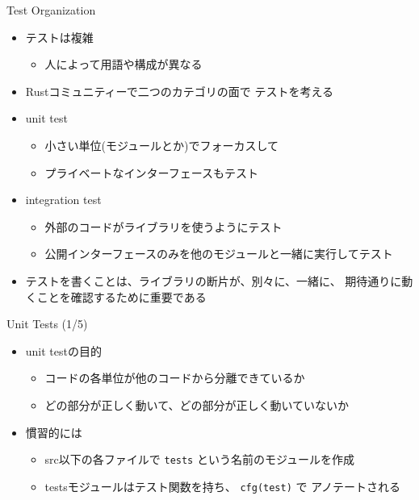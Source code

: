 \documentclass[cjk,14pt,xcolor=dvipsnames,table,dvipdfmx,professional font,t,fragile]{beamer}
\begin{document}
\begin{frame}[fragile]{Test Organization}
 \begin{itemize}
  \item テストは複雑
	\begin{itemize}
	 \item 人によって用語や構成が異なる
	\end{itemize}
  \item Rustコミュニティーで二つのカテゴリの面で
	テストを考える
  \item unit test
	\begin{itemize}
	 \item 小さい単位(モジュールとか)でフォーカスして
	 \item プライベートなインターフェースもテスト
	\end{itemize}
  \item integration test
	\begin{itemize}
	 \item 外部のコードがライブラリを使うようにテスト
	 \item 公開インターフェースのみを他のモジュールと一緒に実行してテスト
	\end{itemize}
  \item テストを書くことは、ライブラリの断片が、別々に、一緒に、
	期待通りに動くことを確認するために重要である
 \end{itemize}
\end{frame}

\begin{frame}[fragile]{Unit Tests (1/5)}
 \begin{itemize}
  \item unit testの目的
	\begin{itemize}
	 \item コードの各単位が他のコードから分離できているか
	 \item どの部分が正しく動いて、どの部分が正しく動いていないか
	\end{itemize}
  \item 慣習的には
	\begin{itemize}
	 \item src以下の各ファイルで \texttt{tests} という名前のモジュールを作成
	 \item testsモジュールはテスト関数を持ち、 \verb|cfg(test)| で
	       アノテートされる
	\end{itemize}
 \end{itemize}
\end{frame}
\end{document}
